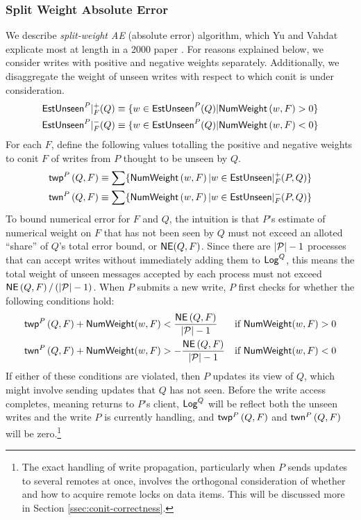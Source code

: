 \documentclass[]             %
{NASA}                       %
\theoremstyle{definition}
\begin{document}
\subsubsection{Split Weight Absolute Error}
We describe \emph{split-weight AE} (absolute error) algorithm, which
Yu and Vahdat explicate most at length in a 2000 paper
\cite{2000tactalgorithms}. For reasons explained below, we consider
writes with positive and negative weights separately. Additionally, we
disaggregate the weight of unseen writes with respect to which conit
is under consideration.
\begin{gather}
  \mathsf{EstUnseen}^P|^+_F{\left(Q\right)} \equiv \{ w \in \mathsf{EstUnseen}^{P}{\left(Q\right)} | \mathsf{NumWeight}\left(w, F\right) > 0 \} \\
  \mathsf{EstUnseen}^P|^-_F{\left(Q\right)} \equiv \{ w \in \mathsf{EstUnseen}^{P}{\left(Q\right)} | \mathsf{NumWeight}\left(w, F\right) < 0 \}
\end{gather}
For each $F$, define the following values totalling the positive and
negative weights to conit $F$ of writes from $P$ thought to be unseen by $Q$.
\begin{gather}
  \mathsf{twp}^{P}\left(Q, F\right) \equiv \sum \{ \mathsf{NumWeight}\left(w, F\right) | w \in \mathsf{EstUnseen}|^+_F{\left(P,Q\right)} \} \\
  \mathsf{twn}^{P}\left(Q, F\right) \equiv \sum \{ \mathsf{NumWeight}\left(w, F\right) | w \in \mathsf{EstUnseen}|^-_F{\left(P,Q\right)} \}
\end{gather}
To bound numerical error for $F$ and $Q$, the intuition is that $P$'s
estimate of numerical weight on $F$ that has not been seen by $Q$ must
not exceed an alloted ``share'' of $Q$'s total error bound, or
$\mathsf{NE}(Q, F)$. Since there are $|\mathcal{P}| - 1$ processes that can
accept writes without immediately adding them to $\mathsf{Log}^{Q}$, this means
the total weight of unseen messages accepted by each process must not
exceed
$\mathsf{NE}\left(Q, F \right) / \left(|\mathcal{P}| - 1\right)$.
When $P$ submits a new write, $P$ first checks for whether the
following conditions hold:
\begin{align*}
  \mathsf{twp}^{P}\left(Q, F\right) + \mathsf{NumWeight}(w, F) &<   \frac{\mathsf{NE}\left(Q, F\right)}{|\mathcal{P}| - 1} & \textrm{if $\mathsf{NumWeight}(w, F) > 0$} \\
  \mathsf{twn}^{P}\left(Q, F\right) + \mathsf{NumWeight}(w, F) &> - \frac{\mathsf{NE}\left(Q, F\right)}{|\mathcal{P}| - 1} & \textrm{if $\mathsf{NumWeight}(w, F) < 0$}
\end{align*}
If either of these conditions are violated, then $P$ updates its view
of $Q$, which might involve sending updates that $Q$ has not
seen. Before the write access completes, meaning returns to $P$'s
client, $\mathsf{Log}^{Q}$ will be reflect both the unseen writes and the write
$P$ is currently handling, and $\mathsf{twp}^{P}\left(Q, F\right)$ and $\mathsf{twn}^{P}\left(Q, F\right)$
will be zero.\footnote{The exact handling of write propagation,
  particularly when $P$ sends updates to several remotes at once,
  involves the orthogonal consideration of whether and how to acquire
  remote locks on data items. This will be discussed more in Section
  \ref{ssec:conit-correctness}.}
\end{document}
